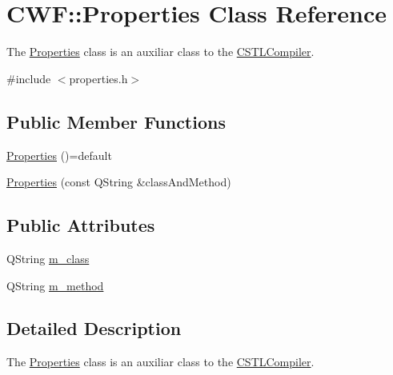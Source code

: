 \hypertarget{class_c_w_f_1_1_properties}{\section{C\+W\+F\+:\+:Properties Class Reference}
\label{class_c_w_f_1_1_properties}
}


The \hyperlink{class_c_w_f_1_1_properties}{Properties} class is an auxiliar class to the \hyperlink{class_c_w_f_1_1_c_s_t_l_compiler}{C\+S\+T\+L\+Compiler}.  




{\ttfamily \#include $<$properties.\+h$>$}

\subsection*{Public Member Functions}
\begin{DoxyCompactItemize}
\item 
\hyperlink{class_c_w_f_1_1_properties_a417638a2312fba16104f19bc59190b35}{Properties} ()=default
\item 
\hyperlink{class_c_w_f_1_1_properties_ad37244d75ca8ae82b8122b2f5d6952a2}{Properties} (const Q\+String \&class\+And\+Method)
\end{DoxyCompactItemize}
\subsection*{Public Attributes}
\begin{DoxyCompactItemize}
\item 
Q\+String \hyperlink{class_c_w_f_1_1_properties_ad77aa99c8e2ea4afe6300d739ba22308}{m\+\_\+class}
\item 
Q\+String \hyperlink{class_c_w_f_1_1_properties_a70682c472acdeef56e50a79f2436833e}{m\+\_\+method}
\end{DoxyCompactItemize}


\subsection{Detailed Description}
The \hyperlink{class_c_w_f_1_1_properties}{Properties} class is an auxiliar class to the \hyperlink{class_c_w_f_1_1_c_s_t_l_compiler}{C\+S\+T\+L\+Compiler}. 

